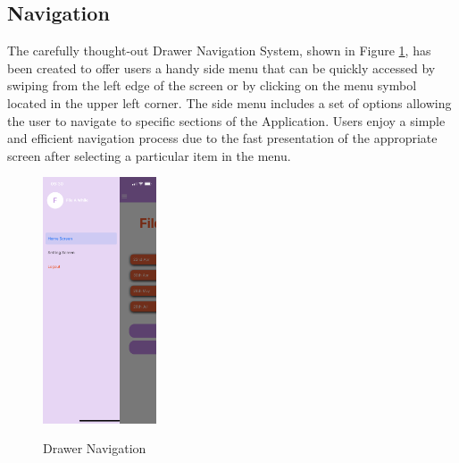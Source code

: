 \subsection{Navigation}
The carefully thought-out Drawer Navigation System, shown in Figure \ref{image:nav}, has been created to offer users a handy side menu that can be quickly accessed by swiping from the left edge of the screen or by clicking on the menu symbol located in the upper left corner. The side menu includes a set of options allowing the user to navigate to specific sections of the Application. Users enjoy a simple and efficient navigation process due to the fast presentation of the appropriate screen after selecting a particular item in the menu.
\begin{figure}[h!]
    \includegraphics[width=0.3\textwidth]
    {images/Nav.png}
    \centering
    \label{image:nav}
    \caption{Drawer Navigation}
\end{figure}

